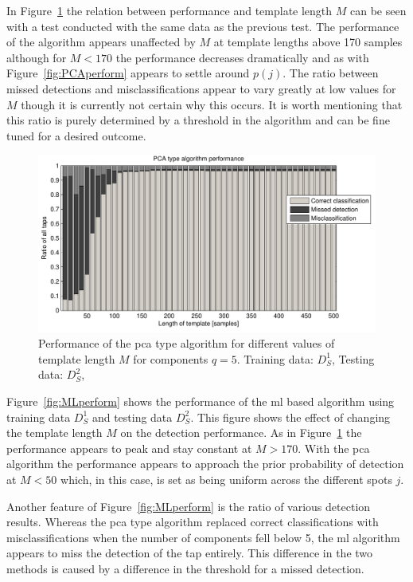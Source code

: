 In Figure~\ref{fig:PCAperformLength} the relation between performance and template length $M$ can be seen with a test conducted with the same data as the previous test. The performance of the algorithm appears unaffected by $M$ at template lengths above 170 samples although for $M<170$ the performance decreases dramatically and as with Figure~\ref{fig:PCAperform} appears to settle around $p(j)$. The ratio between missed detections and misclassifications appear to vary greatly at low values for $M$ though it is currently not certain why this occurs. It is worth mentioning that this ratio is purely determined by a threshold in the algorithm and can be fine tuned for a desired outcome.

\begin{figure}[!] %
\centering
\includegraphics[width=150mm]{PCAperformLength.pdf}
\caption{Performance of the \gls{pca} type algorithm for different values of template length $M$ for components $q=5$. Training data: $D^1_S$, Testing data: $D^2_S$,}\label{fig:PCAperformLength}
\end{figure}

Figure~\ref{fig:MLperform} shows the performance of the \gls{ml} based algorithm using training data $D^1_S$ and testing data $D^2_S$. This figure shows the effect of changing the template length $M$ on the detection performance. As in Figure~\ref{fig:PCAperformLength} the performance appears to peak and stay constant at $M>170$. With the \gls{pca} algorithm the performance appears to approach the prior probability of detection at $M<50$ which, in this case, is set as being uniform across the different spots $j$.

Another feature of Figure~\ref{fig:MLperform} is the ratio of various detection results. Whereas the \gls{pca} type algorithm replaced correct classifications with misclassifications when the number of components fell below 5, the \gls{ml} algorithm appears to miss the detection of the tap entirely. This difference in the two methods is caused by a difference in the threshold for a missed detection.


